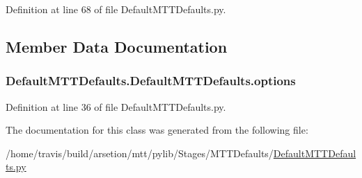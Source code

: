 Definition at line 68 of file Default\-M\-T\-T\-Defaults.\-py.



\subsection{Member Data Documentation}
\hypertarget{classDefaultMTTDefaults_1_1DefaultMTTDefaults_a733e1af4da36392ce6126d79c61aba0b}{
\subsubsection[{options}]{\setlength{\rightskip}{0pt plus 5cm}Default\-M\-T\-T\-Defaults.\-Default\-M\-T\-T\-Defaults.\-options}}\label{classDefaultMTTDefaults_1_1DefaultMTTDefaults_a733e1af4da36392ce6126d79c61aba0b}


Definition at line 36 of file Default\-M\-T\-T\-Defaults.\-py.



The documentation for this class was generated from the following file\-:\begin{DoxyCompactItemize}
\item 
/home/travis/build/arsetion/mtt/pylib/\-Stages/\-M\-T\-T\-Defaults/\hyperlink{DefaultMTTDefaults_8py}{Default\-M\-T\-T\-Defaults.\-py}\end{DoxyCompactItemize}
